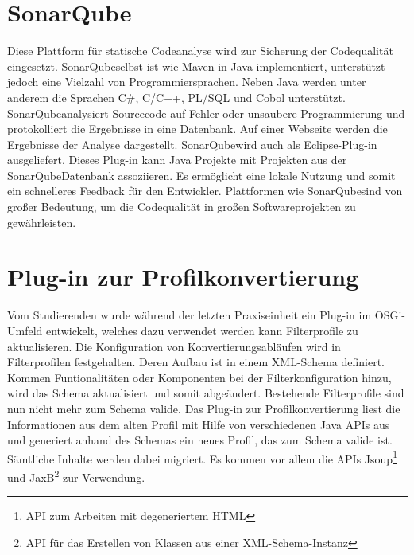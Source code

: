 \section{SonarQube\textsuperscript{\texttrademark}}{
\label{sec:soanr_qube}
Diese Plattform für statische Codeanalyse wird zur Sicherung der Codequalität eingesetzt. SonarQube\textsuperscript{\texttrademark}selbst ist wie Maven in Java implementiert, unterstützt jedoch eine Vielzahl von Programmiersprachen. Neben Java werden unter anderem die Sprachen C\#, C/C++, PL/SQL und Cobol unterstützt. SonarQube\textsuperscript{\texttrademark}analysiert Sourcecode auf Fehler oder unsaubere Programmierung und protokolliert die Ergebnisse in eine Datenbank. Auf einer Webseite werden die Ergebnisse der Analyse dargestellt. SonarQube\textsuperscript{\texttrademark}wird auch als Eclipse-Plug-in ausgeliefert. Dieses Plug-in kann Java Projekte mit Projekten aus der SonarQube\textsuperscript{\texttrademark}Datenbank assoziieren. Es ermöglicht eine lokale Nutzung und somit ein schnelleres Feedback für den Entwickler. Plattformen wie SonarQube\textsuperscript{\texttrademark}sind von großer Bedeutung, um die Codequalität in großen Softwareprojekten zu gewährleisten.  
}


\section{Plug-in zur Profilkonvertierung}{
Vom Studierenden wurde während der letzten Praxiseinheit ein \gls{Plug-in} im \ac{OSGi}-Umfeld entwickelt, welches dazu verwendet werden kann Filterprofile zu aktualisieren. Die Konfiguration von Konvertierungsabläufen wird in Filterprofilen festgehalten. Deren Aufbau ist in einem XML-Schema definiert. Kommen Funtionalitäten oder Komponenten bei der Filterkonfiguration hinzu, wird das Schema aktualisiert und somit abgeändert. Bestehende Filterprofile sind nun nicht mehr zum Schema valide. Das Plug-in zur Profilkonvertierung liest die Informationen aus dem alten Profil mit Hilfe von verschiedenen Java \ac{API}s aus und generiert anhand des Schemas ein neues Profil, das zum Schema valide ist. Sämtliche Inhalte werden dabei migriert. Es kommen vor allem die \ac{API}s  Jsoup\footnote{API zum Arbeiten mit degeneriertem HTML} und \ac{JaxB}\footnote{API für das Erstellen von Klassen aus einer XML-Schema-Instanz} zur Verwendung.
}

